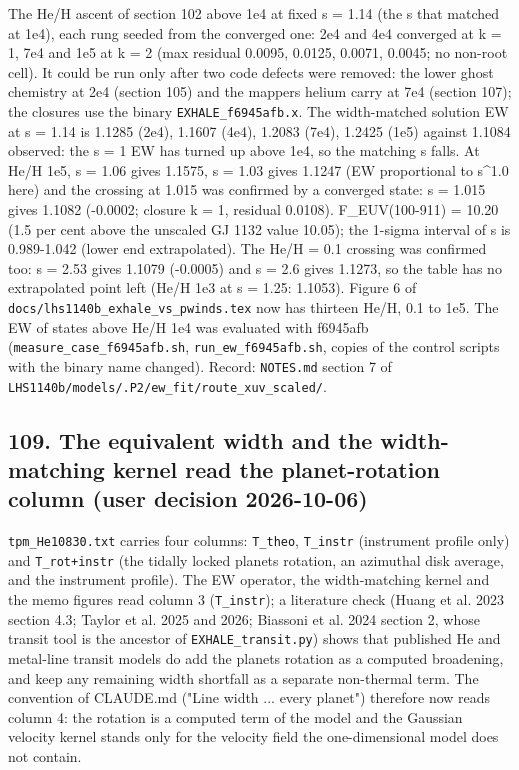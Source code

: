 \documentclass[english,a4paper]{my_memo}
\begin{document}
The He/H ascent of section 102 above 1e4 at fixed s = 1.14 (the s that matched
at 1e4), each rung seeded from the converged one: 2e4 and 4e4 converged at
k = 1, 7e4 and 1e5 at k = 2 (max residual 0.0095, 0.0125, 0.0071, 0.0045; no
non-root cell). It could be run only after two code defects were removed: the
lower ghost chemistry at 2e4 (section 105) and the mapper\textquotesingle s helium carry at
7e4 (section 107); the closures use the binary \texttt{EXHALE\_f6945afb.x}. The
width-matched solution EW at s = 1.14 is 1.1285 (2e4), 1.1607 (4e4), 1.2083
(7e4), 1.2425 (1e5) against 1.1084 observed: the s = 1 EW has turned up above
1e4, so the matching s falls. At He/H 1e5, s = 1.06 gives 1.1575, s = 1.03
gives 1.1247 (EW proportional to s\^{}1.0 here) and the crossing at 1.015 was
confirmed by a converged state: s = 1.015 gives 1.1082 (-0.0002; closure
k = 1, residual 0.0108). F\_EUV(100-911) = 10.20 (1.5 per cent above the
unscaled GJ 1132 value 10.05); the 1-sigma interval of s is 0.989-1.042 (lower
end extrapolated). The He/H = 0.1 crossing was confirmed too: s = 2.53 gives
1.1079 (-0.0005) and s = 2.6 gives 1.1273, so the table has no extrapolated
point left (He/H 1e3 at s = 1.25: 1.1053). Figure 6 of
\texttt{docs/lhs1140b\_exhale\_vs\_pwinds.tex} now has thirteen He/H, 0.1 to 1e5.
The EW of states above He/H 1e4 was evaluated with f6945afb
(\texttt{measure\_case\_f6945afb.sh}, \texttt{run\_ew\_f6945afb.sh}, copies of the control
scripts with the binary name changed). Record: \texttt{NOTES.md} section 7 of
\texttt{LHS1140b/models/.P2/ew\_fit/route\_xuv\_scaled/}.

\subsection{109. The equivalent width and the width-matching kernel read the planet-rotation column (user decision 2026-10-06)}\label{109-the-equivalent-width-and-the-width-matching-kernel-read-the-planet-rotation-column-user-decision-2026-10-06}

\texttt{tpm\_He10830.txt} carries four columns: \texttt{T\_theo}, \texttt{T\_instr} (instrument
profile only) and \texttt{T\_rot+instr} (the tidally locked planet\textquotesingle s rotation, an
azimuthal disk average, and the instrument profile). The EW operator, the
width-matching kernel and the memo figures read column 3 (\texttt{T\_instr}); a
literature check (Huang et al. 2023 section 4.3; Taylor et al. 2025 and 2026;
Biassoni et al. 2024 section 2, whose transit tool is the ancestor of
\texttt{EXHALE\_transit.py}) shows that published He and metal-line transit models do
add the planet\textquotesingle s rotation as a computed broadening, and keep any remaining
width shortfall as a separate non-thermal term. The convention of CLAUDE.md
("Line width ... every planet") therefore now reads column 4: the rotation is
a computed term of the model and the Gaussian velocity kernel stands only for
the velocity field the one-dimensional model does not contain.
\end{document}
